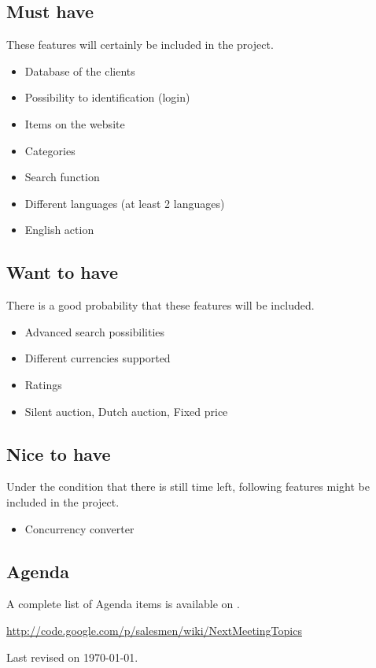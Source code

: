 \documentclass[a4paper, 12pt]{article}
\begin{document}
	\subsection{Must have}
	These features will certainly be included in the project.
		\begin{itemize}
			\item Database of the clients
			\item Possibility to identification (login)
			\item Items on the website
			\item Categories
			\item Search function
			\item Different languages (at least 2 languages)
			\item English action
		\end{itemize}
	
	\subsection{Want to have}
	There is a good probability that these features will be included.
		\begin{itemize}
			\item Advanced search possibilities
			\item Different currencies supported
			\item Ratings
			\item Silent auction, Dutch auction, Fixed price 
		\end{itemize}
		
	\subsection{Nice to have}
	Under the condition that there is still time left, following features might be included in the project.
		\begin{itemize}
			\item Concurrency converter
		\end{itemize}
	\subsection{Agenda}
	A complete list of Agenda items is available on \cite{site1}.

			
		
	
	
	\begin{thebibliography}{99}

		\href{http://code.google.com/p/salesmen/wiki/NextMeetingTopics}{http://code.google.com/p/salesmen/wiki/NextMeetingTopics}

		
	\end{thebibliography}	
	
	\begin{center}
	 	Last revised on \today.
	\end{center}
	
	
\end{document}
